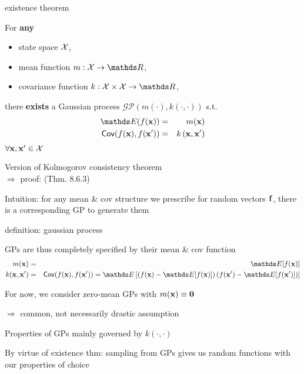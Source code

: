 \documentclass[11pt,compress,t,notes=noshow, xcolor=table]{beamer}
\begin{document}
\begin{framei}[sep=L]{existence theorem}
\item For \textbf{any} 
\begin{itemize}
\item state space $\mathcal{X}$,
\item mean function $m: \Xspace \rightarrow \R$,
\item covariance function $k: \Xspace \times \Xspace \rightarrow \R$, 
\end{itemize}
there \textbf{exists} a Gaussian process $\mathcal{GP}(m(\cdot), k(\cdot, \cdot))$ s.t.
\begin{eqnarray*}
\E(\fx) &=& m(\xv) \\
\cov(\fx, f(\xv^\prime)) &=& \kxxp
\end{eqnarray*}
$\forall \mathbf{x}, \mathbf{x}^\prime \in \mathcal{X}$
\item Version of Kolmogorov consistency theorem  \\
$\Rightarrow$ proof:  (Thm. 8.6.3)
\item Intuition: for any mean \& cov structure we prescribe for random vectors $\mathbf{f}$, there is a corresponding GP to generate them
\end{framei}

\begin{framei}[sep=L]{definition: gaussian process}
\item GPs are thus completely specified by their mean \& cov function
\begin{eqnarray*}
m(\xv) &=& \E[f(\xv)] \\
k(\xv, \xv^\prime) &=& \cov(\fx, f(\xv^\prime)) = \E \left[\left( f(\xv) - \E[f(\xv)] \right) \left( f(\xv^\prime) - \E[f(\xv^\prime)] \right) \right]
\end{eqnarray*}
\item For now, we consider zero-mean GPs with $m(\mathbf{x}) \equiv \mathbf{0}$ 

$\Rightarrow$ common, not necessarily drastic assumption 
\item Properties of GPs mainly governed by $k(\cdot, \cdot)$
\item By virtue of existence thm: sampling from GPs gives us random functions with our properties of choice
\end{framei}
\end{document}
